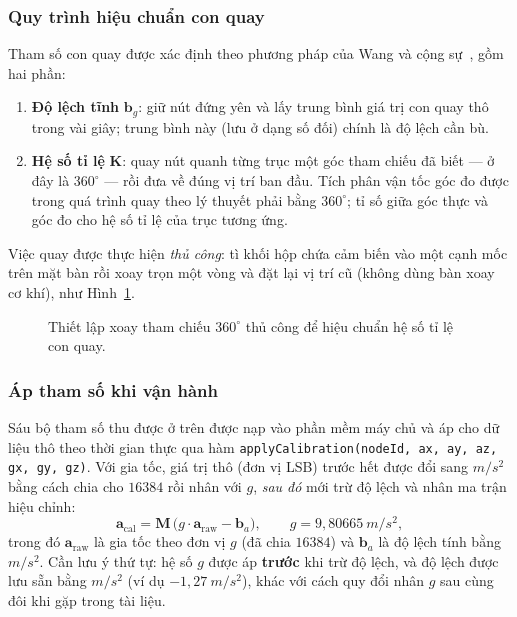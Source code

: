 \documentclass[../DoAn.tex]{subfiles}
\begin{document}
\subsubsection*{Quy trình hiệu chuẩn con quay}
Tham số con quay được xác định theo phương pháp của Wang và cộng sự~\cite{wang2024}, gồm hai phần:
\begin{enumerate}
    \item \textbf{Độ lệch tĩnh} $\mathbf{b}_g$: giữ nút đứng yên và lấy trung bình giá trị con quay thô trong vài giây; trung bình này (lưu ở dạng số đối) chính là độ lệch cần bù.
    \item \textbf{Hệ số tỉ lệ} $\mathbf{K}$: quay nút quanh từng trục một góc tham chiếu đã biết --- ở đây là $360^{\circ}$ --- rồi đưa về đúng vị trí ban đầu. Tích phân vận tốc góc đo được trong quá trình quay theo lý thuyết phải bằng $360^{\circ}$; tỉ số giữa góc thực và góc đo cho hệ số tỉ lệ của trục tương ứng.
\end{enumerate}
Việc quay được thực hiện \emph{thủ công}: tì khối hộp chứa cảm biến vào một cạnh mốc trên mặt bàn rồi xoay trọn một vòng và đặt lại vị trí cũ (không dùng bàn xoay cơ khí), như Hình~\ref{fig:calib_rotation}.

\begin{figure}[H]
    \centering
    \caption{Thiết lập xoay tham chiếu $360^{\circ}$ thủ công để hiệu chuẩn hệ số tỉ lệ con quay.}
    \label{fig:calib_rotation}
\end{figure}

\subsubsection*{Áp tham số khi vận hành}
Sáu bộ tham số thu được ở trên được nạp vào phần mềm máy chủ và áp cho dữ liệu thô theo thời gian thực qua hàm \texttt{applyCalibration(nodeId, ax, ay, az, gx, gy, gz)}. Với gia tốc, giá trị thô (đơn vị LSB) trước hết được đổi sang $\si{m/s^2}$ bằng cách chia cho $16384$ rồi nhân với $g$, \emph{sau đó} mới trừ độ lệch và nhân ma trận hiệu chỉnh:
\begin{equation}
    \mathbf{a}_{\mathrm{cal}} = \mathbf{M}\,\big( g\cdot \mathbf{a}_{\mathrm{raw}} - \mathbf{b}_a \big), \qquad g = 9{,}80665~\si{m/s^2},
    \label{eq:accelcalib}
\end{equation}
trong đó $\mathbf{a}_{\mathrm{raw}}$ là gia tốc theo đơn vị $g$ (đã chia $16384$) và $\mathbf{b}_a$ là độ lệch tính bằng $\si{m/s^2}$. Cần lưu ý thứ tự: hệ số $g$ được áp \textbf{trước} khi trừ độ lệch, và độ lệch được lưu sẵn bằng $\si{m/s^2}$ (ví dụ $-1{,}27~\si{m/s^2}$), khác với cách quy đổi nhân $g$ sau cùng đôi khi gặp trong tài liệu.
\end{document}
